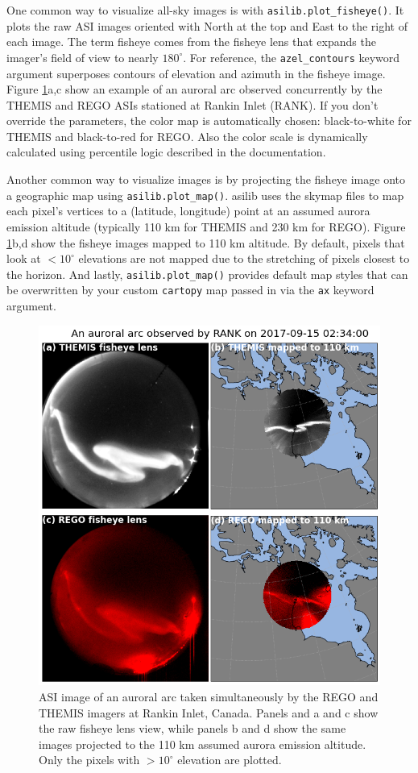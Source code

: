 \documentclass[draft]{agujournal2019}
\begin{document}
One common way to visualize all-sky images is with \verb|asilib.plot_fisheye()|. It plots the raw ASI images oriented with North at the top and East to the right of each image. The term fisheye comes from the fisheye lens that expands the imager's field of view to nearly $180^\circ$. For reference, the \verb|azel_contours| keyword argument superposes contours of elevation and azimuth in the fisheye image. Figure \ref{fig2}a,c show an example of an auroral arc observed concurrently by the THEMIS and REGO ASIs stationed at Rankin Inlet (RANK). If you don't override the parameters, the color map is automatically chosen: black-to-white for THEMIS and black-to-red for REGO. Also the color scale is dynamically calculated using percentile logic described in the documentation.

Another common way to visualize images is by projecting the fisheye image onto a geographic map using \verb|asilib.plot_map()|. asilib uses the skymap files to map each pixel's vertices to a (latitude, longitude) point at an assumed aurora emission altitude (typically 110 km for THEMIS and 230 km for REGO). Figure \ref{fig2}b,d show the fisheye images mapped to 110 km altitude. By default, pixels that look at $< 10^\circ$ elevations are not mapped due to the stretching of pixels closest to the horizon. And lastly, \verb|asilib.plot_map()| provides default map styles that can be overwritten by your custom \verb|cartopy| map passed in via the \verb|ax| keyword argument.

\begin{figure}
      \includegraphics[width=\textwidth]{figures/fig2.png}
      \caption{ASI image of an auroral arc taken simultaneously by the REGO and THEMIS imagers at Rankin Inlet, Canada. Panels and a and c show the raw fisheye lens view, while panels b and d show the same images projected to the 110 km assumed aurora emission altitude. Only the pixels with $>10^\circ$ elevation are plotted.}
      \label{fig2}
\end{figure}
\end{document}
